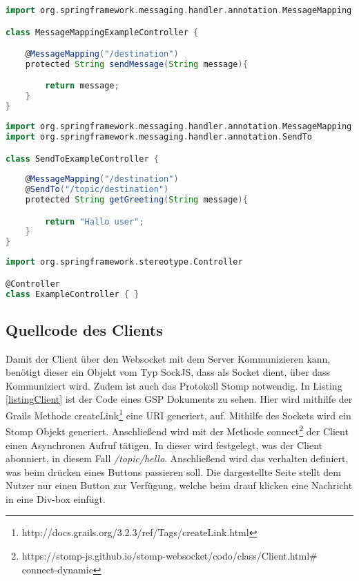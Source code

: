 \begin{lstlisting}[language=Groovy,caption={Beispiel von @MessageMapping}, label=messagmap]
import org.springframework.messaging.handler.annotation.MessageMapping

class MessageMappingExampleController {

    @MessageMapping("/destination")
    protected String sendMessage(String message){

    	return message;
    }
}
\end{lstlisting}

\begin{lstlisting}[language=Groovy,caption={Beispiel von @SendTo}, label=sendto]
import org.springframework.messaging.handler.annotation.MessageMapping
import org.springframework.messaging.handler.annotation.SendTo

class SendToExampleController {
  
	@MessageMapping("/destination")
	@SendTo("/topic/destination")
    protected String getGreeting(String message){

    	return "Hallo user";
    }
}
\end{lstlisting}

\begin{lstlisting}[language=Groovy,caption={Beispiel von @Controller}, label=controller]
import org.springframework.stereotype.Controller

@Controller
class ExampleController { }
\end{lstlisting}

\subsection{Quellcode des Clients}

Damit der Client über den Websocket mit dem Server Kommunizieren kann, benötigt dieser ein Objekt vom Typ SockJS, dass als Socket dient, über dass Kommuniziert wird. Zudem ist auch das Protokoll Stomp notwendig. In Listing \ref{listingClient} ist der Code eines \ac{GSP} Dokuments zu sehen. Hier wird mithilfe der Grails Methode createLink\footnote{http://docs.grails.org/3.2.3/ref/Tags/createLink.html} eine \ac{URI} generiert, auf.
Mithilfe des Sockets wird ein Stomp Objekt generiert. Anschließend wird mit der Methode connect\footnote{https://stomp-js.github.io/stomp-websocket/codo/class/Client.html\# connect-dynamic} der Client einen Asynchronen Aufruf tätigen. In dieser wird festgelegt, was der Client abonniert, in diesem Fall \textit{/topic/hello}. 
Anschließend wird das verhalten definiert, was beim drücken eines Buttons passieren soll.
Die dargestellte Seite stellt dem Nutzer nur einen Button zur Verfügung, welche beim drauf klicken eine Nachricht in eine Div-box einfügt. 


